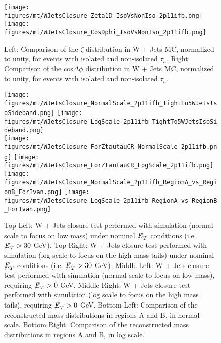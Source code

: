 \begin{figure}\centering
  \texttt{[image: figures/mt/WJetsClosure\_Zeta1D\_IsoVsNonIso\_2p11ifb.png]}
  \texttt{[image: figures/mt/WJetsClosure\_CosDphi\_IsoVsNonIso\_2p11ifb.png]}
  \caption{\label{fig:ZetaAndCosDphiVsTauIso} Left: Comparison of the $\zeta$ distribution in W + Jets MC, normalized to unity, for events with isolated and 
non-isolated $\tau_{h}$.  Right: Comparison of the cos$\Delta\phi$ distribution in W + Jets MC, normalized to unity, for events with isolated and
non-isolated $\tau_{h}$.}
\end{figure}

\begin{figure}\centering
  \texttt{[image: figures/mt/WJetsClosure\_NormalScale\_2p11ifb\_TightTo5WJetsIsoSideband.png]}
  \texttt{[image: figures/mt/WJetsClosure\_LogScale\_2p11ifb\_TightTo5WJetsIsoSideband.png]} \\
  \texttt{[image: figures/mt/WJetsClosure\_ForZtautauCR\_NormalScale\_2p11ifb.png]}
  \texttt{[image: figures/mt/WJetsClosure\_ForZtautauCR\_LogScale\_2p11ifb.png]} \\
  \texttt{[image: figures/mt/WJetsClosure\_NormalScale\_2p11ifb\_RegionA\_vs\_RegionB\_ForIvan.png]}
  \texttt{[image: figures/mt/WJetsClosure\_LogScale\_2p11ifb\_RegionA\_vs\_RegionB\_ForIvan.png]}
  \caption{\label{fig:wJetsClosureMuTau} Top Left: W + Jets closure test performed with simulation (normal scale to focus on low mass) under nominal ${\not\mathrel{E}}_T$ 
conditions (i.e. ${\not\mathrel{E}}_T > 30$ GeV).  Top Right: 
W + Jets closure test performed with simulation (log scale to focus on the high mass tails) under nominal ${\not\mathrel{E}}_T$
conditions (i.e. ${\not\mathrel{E}}_T > 30$ GeV).  Middle Left: W + Jets closure test performed 
with simulation (normal scale to focus on low mass), requiring ${\not\mathrel{E}}_T > 0$ GeV.  Middle Right: W + Jets closure test performed with simulation (log scale to 
focus on the high mass tails), requiring ${\not\mathrel{E}}_T > 0$ GeV.  Bottom Left: Comparison of the reconstructed mass distributions in regions A and B, in normal scale.  
Bottom Right: Comparison of the reconstructed mass distributions in regions A and B, in log scale.} 
\end{figure}

